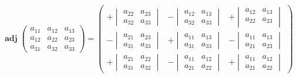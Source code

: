 \tiny
\begin{equation*}
\mathop{\mathbf{adj}}
\begin{pmatrix}
            a_{11} & a_{12} & a_{13} \\
            a_{12} & a_{22} & a_{23} \\
            a_{31} & a_{32} & a_{33}
        \end{pmatrix}
        =
        \begin{pmatrix}
            +
            \begin{vmatrix}
                a_{22} & a_{23} \\
                a_{32} & a_{33}
            \end{vmatrix} &
            -
            \begin{vmatrix}
                a_{12} & a_{13} \\
                a_{32} & a_{33}
            \end{vmatrix} &
            +
            \begin{vmatrix}
                a_{12} & a_{13} \\
                a_{22} & a_{23} \\
            \end{vmatrix} \\[1.5em]
            -
            \begin{vmatrix}
                a_{21} & a_{23} \\
                a_{31} & a_{33}
            \end{vmatrix} &
            +
            \begin{vmatrix}
                a_{11} & a_{13} \\
                a_{31} & a_{33}
            \end{vmatrix}&
            -
            \begin{vmatrix}
                a_{11} &  a_{13} \\
                a_{21} &  a_{23}
            \end{vmatrix} \\[1.5em]
            +
            \begin{vmatrix}
                a_{21} & a_{22} \\
                a_{31} & a_{32}
            \end{vmatrix} &
            -
            \begin{vmatrix}
            a_{11} & a_{12} \\
            a_{21} & a_{22}
            \end{vmatrix} &
            +
            \begin{vmatrix}
                a_{11} & a_{12} \\
                a_{21} & a_{22}
            \end{vmatrix}
        \end{pmatrix}
\end{equation*}
\scriptsize